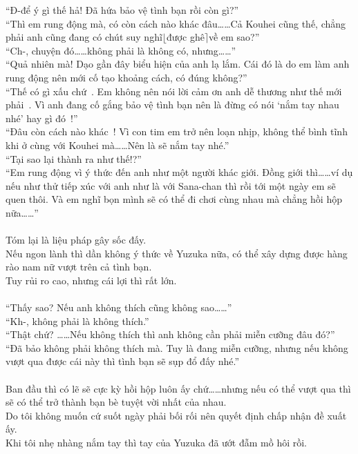 \documentclass[12pt,a4paper, twosides]{book}
\begin{document}
“Đ-để ý gì thế hả! Đã hứa bảo vệ tình bạn rồi còn gì?”\\
“Thì em rung động mà, có còn cách nào khác đâu……Cả Kouhei cũng thế, chẳng phải anh cũng đang có chút suy nghĩ$\lfloor$được ghê$\rceil$về em sao?”\\
“Ch-, chuyện đó……không phải là không có, nhưng……”\\
“Quả nhiên mà! Dạo gần đây biểu hiện của anh lạ lắm. Cái đó là do em làm anh rung động nên mới cố tạo khoảng cách, có đúng không?”\\
“Thế có gì xấu chứ~. Em không nên nói lời cảm ơn anh dễ thương như thế mới phải~. Vì anh đang cố gắng bảo vệ tình bạn nên là đừng có nói ‘nắm tay nhau nhé’ hay gì đó~!”\\
“Đâu còn cách nào khác~! Vì con tim em trở nên loạn nhịp, không thể bình tĩnh khi ở cùng với Kouhei mà……Nên là sẽ nắm tay nhé.”\\
“Tại sao lại thành ra như thế!?”\\
“Em rung động vì ý thức đến anh như một người khác giới. Đồng giới thì……ví dụ nếu như thử tiếp xúc với anh như là với Sana-chan thì rồi tới một ngày em sẽ quen thôi. Và em nghĩ bọn mình sẽ có thể đi chơi cùng nhau mà chẳng hồi hộp nữa……”\\
\\
Tóm lại là liệu pháp gây sốc đấy.\\
Nếu ngon lành thì dần không ý thức về Yuzuka nữa, có thể xây dựng được hàng rào nam nữ vượt trên cả tình bạn.\\
Tuy rủi ro cao, nhưng cái lợi thì rất lớn.\\
\\
“Thấy sao? Nếu anh không thích cũng không sao……”\\
“Kh-, không phải là không thích.”\\
“Thật chứ? ……Nếu không thích thì anh không cần phải miễn cưỡng đâu đó?”\\
“Đã bảo không phải không thích mà. Tuy là đang miễn cưỡng, nhưng nếu không vượt qua được cái này thì tình bạn sẽ sụp đổ đấy nhé.”\\
\\
Ban đầu thì có lẽ sẽ cực kỳ hồi hộp luôn ấy chứ……nhưng nếu có thể vượt qua thì sẽ có thể trở thành bạn bè tuyệt vời nhất của nhau.\\
Do tôi không muốn cứ suốt ngày phải bối rối nên quyết định chấp nhận đề xuất ấy.\\
Khi tôi nhẹ nhàng nắm tay thì tay của Yuzuka đã ướt đẫm mồ hôi rồi.\\
\\
\end{document}
